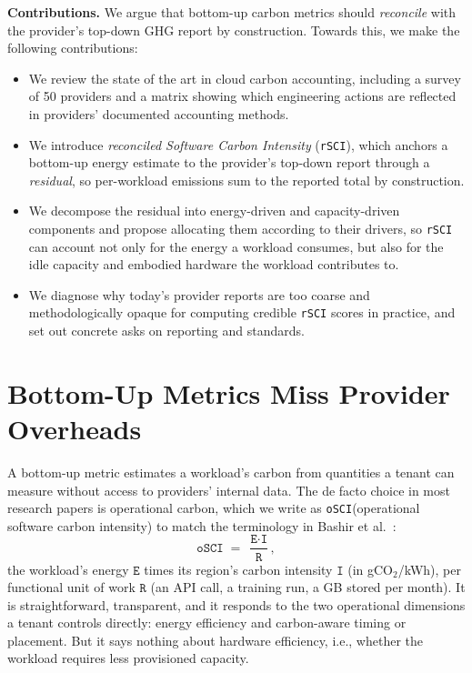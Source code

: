 \documentclass[sigconf]{acmart}
\newcommand{\parag}[1]{\vspace{2mm}\noindent\textbf{#1.}\hspace{2mm}}
\newcommand{\RSCI}{\texttt{rSCI}\xspace}
\newcommand{\OSCI}{\texttt{oSCI}\xspace}
\newcommand{\E}{\texttt{E}\xspace}
\newcommand{\I}{\texttt{I}\xspace}
\newcommand{\R}{\texttt{R}\xspace}
\begin{document}
\parag{Contributions}
We argue that bottom-up carbon metrics should \emph{reconcile} with the provider's top-down GHG report by construction.
Towards this, we make the following contributions:
\begin{itemize}
\item We review the state of the art in cloud carbon accounting, including a survey of 50 providers and a matrix showing which engineering actions are reflected in providers' documented accounting methods.
\item We introduce \emph{reconciled Software Carbon Intensity} (\RSCI), which anchors a bottom-up energy estimate to the provider's top-down report through a \emph{residual}, so per-workload emissions sum to the reported total by construction.
\item We decompose the residual into energy-driven and capacity-driven components and propose allocating them according to their drivers, so \RSCI can account not only for the energy a workload consumes, but also for the idle capacity and embodied hardware the workload contributes to.
\item We diagnose why today's provider reports are too coarse and methodologically opaque for computing credible \RSCI scores in practice, and set out concrete asks on reporting and standards.
\end{itemize}

 \section{Bottom-Up Metrics Miss Provider Overheads}
\label{sec:background}

A bottom-up metric estimates a workload's carbon from quantities a tenant can measure without access to providers' internal data.
The de facto choice in most research papers is operational carbon, which we write as \OSCI (operational software carbon intensity) to match the terminology in Bashir et al.~\cite{bashir2024}:
\[
\OSCI \;=\; \frac{\E \cdot \I}{\R},
\]
the workload's energy $\E$ times its region's carbon intensity $\I$ (in gCO$_2$/kWh), per functional unit of work $\R$ (an API call, a training run, a GB stored per month).%
It is straightforward, transparent, and it responds to the two operational dimensions a tenant controls directly: energy efficiency and carbon-aware timing or placement.
But it says nothing about hardware efficiency, i.e., whether the workload requires less provisioned capacity.
\end{document}
